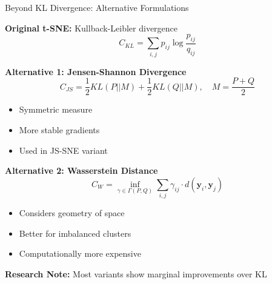 \documentclass[10pt]{beamer}
\begin{document}
\begin{frame}{Beyond KL Divergence: Alternative Formulations}

\textbf{Original t-SNE:} Kullback-Leibler divergence
\begin{equation}
C_{KL} = \sum_{i,j} p_{ij} \log \frac{p_{ij}}{q_{ij}}
\end{equation}

\vspace{0.15cm}
\textbf{Alternative 1: Jensen-Shannon Divergence}
\begin{equation}
C_{JS} = \frac{1}{2}KL(P||M) + \frac{1}{2}KL(Q||M), \quad M = \frac{P+Q}{2}
\end{equation}
\begin{itemize}
    \item Symmetric measure
    \item More stable gradients
    \item Used in JS-SNE variant
\end{itemize}

\vspace{0.15cm}
\textbf{Alternative 2: Wasserstein Distance}
\begin{equation}
C_{W} = \inf_{\gamma \in \Gamma(P,Q)} \sum_{i,j} \gamma_{ij} \cdot d(\mathbf{y}_i, \mathbf{y}_j)
\end{equation}
\begin{itemize}
    \item Considers geometry of space
    \item Better for imbalanced clusters
    \item Computationally more expensive
\end{itemize}

\vspace{0.1cm}
\textbf{Research Note:} Most variants show marginal improvements over KL

\end{frame}
\end{document}
